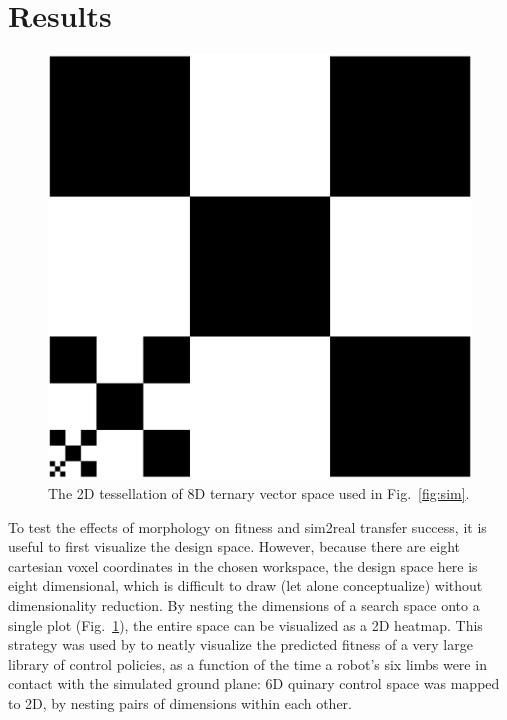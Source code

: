 
\section{Results}
\label{sec:results}


\begin{figure}
\vspace{-1em}
\includegraphics[width=\linewidth]{Chapter02/fig/legend.pdf}
\vspace{-15pt}
\caption{The 2D tessellation of 8D ternary vector space used in Fig.~\ref{fig:sim}.}
\label{fig:tesselation}
\vspace{-0.5em}
\end{figure}


To test the effects of morphology on fitness and sim2real transfer success, it is useful to first visualize the design space. 
However, because there are eight cartesian voxel coordinates in the chosen workspace, the design space here is eight dimensional, which is difficult to draw (let alone conceptualize) without dimensionality reduction.
By nesting the dimensions of a search space onto a single plot (Fig.~\ref{fig:tesselation}), the entire space can be visualized as a 2D heatmap.
This strategy was used by \citet{cully2015robots} to neatly visualize the predicted fitness of a very large library of control policies, as a function of the time a robot's six limbs were in contact with the simulated ground plane: 6D quinary control space was mapped to 2D, by nesting pairs of dimensions within each other.

